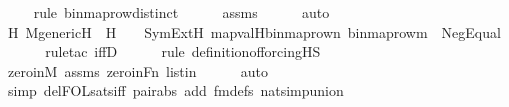\begin{isabellebody}
\ \ \ \ \isamarkupfalse%
{\isacharparenleft}{\kern0pt}rule\ binmap{\isacharunderscore}{\kern0pt}row{\isacharprime}{\kern0pt}{\isacharunderscore}{\kern0pt}distinct{\isacharparenright}{\kern0pt}\isanewline
\ \ \ \ \isamarkupfalse%
\ assms\isanewline
\ \ \ \ \isamarkupfalse%
\ auto\isanewline
\ \ \isamarkupfalse%
\ \isamarkupfalse%
\ {\isachardoublequoteopen}{\isacharparenleft}{\kern0pt}{\isasymforall}H{\isachardot}{\kern0pt}\ M{\isacharunderscore}{\kern0pt}generic{\isacharparenleft}{\kern0pt}H{\isacharparenright}{\kern0pt}\ {\isasymand}\ {}{\isasymin}H\ \ {\isasymlongrightarrow}\ \ SymExt{\isacharparenleft}{\kern0pt}H{\isacharparenright}{\kern0pt}{\isacharcomma}{\kern0pt}\ map{\isacharparenleft}{\kern0pt}val{\isacharparenleft}{\kern0pt}H{\isacharparenright}{\kern0pt}{\isacharcomma}{\kern0pt}{\isacharbrackleft}{\kern0pt}binmap{\isacharunderscore}{\kern0pt}row{\isacharprime}{\kern0pt}{\isacharparenleft}{\kern0pt}n{\isacharparenright}{\kern0pt}{\isacharcomma}{\kern0pt}\ binmap{\isacharunderscore}{\kern0pt}row{\isacharprime}{\kern0pt}{\isacharparenleft}{\kern0pt}m{\isacharparenright}{\kern0pt}{\isacharbrackright}{\kern0pt}{\isacharparenright}{\kern0pt}\ {\isasymTurnstile}\ Neg{\isacharparenleft}{\kern0pt}Equal{\isacharparenleft}{\kern0pt}{}{\isacharcomma}{\kern0pt}\ {}{\isacharparenright}{\kern0pt}{\isacharparenright}{\kern0pt}{\isacharparenright}{\kern0pt}{\isachardoublequoteclose}\isanewline
\ \ \ \ \isamarkupfalse%
{\isacharparenleft}{\kern0pt}rule{\isacharunderscore}{\kern0pt}tac\ iffD{}{\isacharparenright}{\kern0pt}\isanewline
\ \ \ \ \ \isamarkupfalse%
{\isacharparenleft}{\kern0pt}rule\ definition{\isacharunderscore}{\kern0pt}of{\isacharunderscore}{\kern0pt}forcing{\isacharunderscore}{\kern0pt}HS{\isacharparenright}{\kern0pt}\isanewline
\ \ \ \ \isamarkupfalse%
\ zero{\isacharunderscore}{\kern0pt}in{\isacharunderscore}{\kern0pt}M\ assms\ zero{\isacharunderscore}{\kern0pt}in{\isacharunderscore}{\kern0pt}Fn\ listin\isanewline
\ \ \ \ \isamarkupfalse%
\ auto{\isacharbrackleft}{\kern0pt}{}{\isacharbrackright}{\kern0pt}\isanewline
\ \ \ \ \ \isamarkupfalse%
\ {\isacharparenleft}{\kern0pt}simp\ del{\isacharcolon}{\kern0pt}FOL{\isacharunderscore}{\kern0pt}sats{\isacharunderscore}{\kern0pt}iff\ pair{\isacharunderscore}{\kern0pt}abs\ add{\isacharcolon}{\kern0pt}\ fm{\isacharunderscore}{\kern0pt}defs\ nat{\isacharunderscore}{\kern0pt}simp{\isacharunderscore}{\kern0pt}union{\isacharparenright}{\kern0pt}\isanewline

\end{isabellebody}
